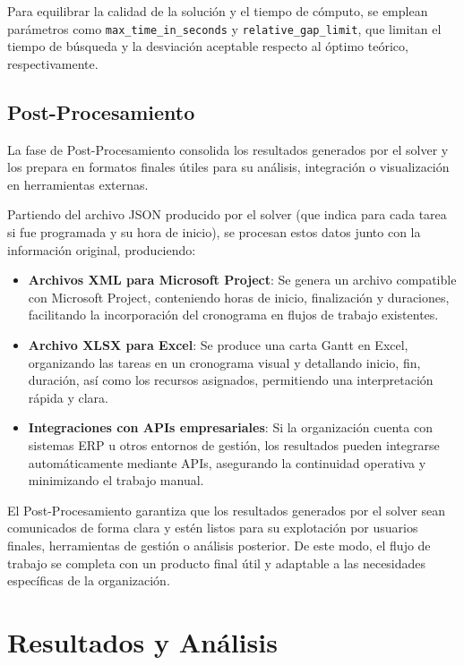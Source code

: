 \documentclass{article}
\begin{document}
Para equilibrar la calidad de la solución y el tiempo de cómputo, se emplean parámetros como \texttt{max\_time\_in\_seconds} y \texttt{relative\_gap\_limit}, que limitan el tiempo de búsqueda y la desviación aceptable respecto al óptimo teórico, respectivamente.


\subsection{Post-Procesamiento}

La fase de Post-Procesamiento consolida los resultados generados por el solver y los prepara en formatos finales útiles para su análisis, integración o visualización en herramientas externas.

Partiendo del archivo JSON producido por el solver (que indica para cada tarea si fue programada y su hora de inicio), se procesan estos datos junto con la información original, produciendo:

\begin{itemize}
    \item \textbf{Archivos XML para Microsoft Project}: Se genera un archivo compatible con Microsoft Project, conteniendo horas de inicio, finalización y duraciones, facilitando la incorporación del cronograma en flujos de trabajo existentes.

    \item \textbf{Archivo XLSX para Excel}: Se produce una carta Gantt en Excel, organizando las tareas en un cronograma visual y detallando inicio, fin, duración, así como los recursos asignados, permitiendo una interpretación rápida y clara.

    \item \textbf{Integraciones con APIs empresariales}: Si la organización cuenta con sistemas ERP u otros entornos de gestión, los resultados pueden integrarse automáticamente mediante APIs, asegurando la continuidad operativa y minimizando el trabajo manual.
\end{itemize}

El Post-Procesamiento garantiza que los resultados generados por el solver sean comunicados de forma clara y estén listos para su explotación por usuarios finales, herramientas de gestión o análisis posterior. De este modo, el flujo de trabajo se completa con un producto final útil y adaptable a las necesidades específicas de la organización.

\section{Resultados y Análisis}
\end{document}
